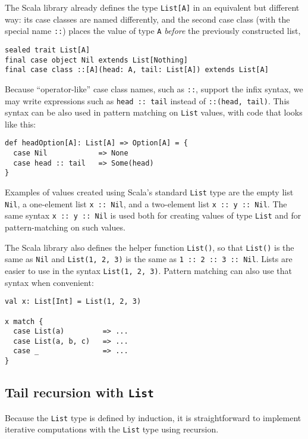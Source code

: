 The Scala library already defines the type \lstinline!List[A]! in
an equivalent but different way: its case classes are named differently,
and the second case class (with the special name \lstinline!::!)
places the value of type \lstinline!A! \emph{before} the previously
constructed list,
\begin{lstlisting}
sealed trait List[A]
final case object Nil extends List[Nothing]
final case class ::[A](head: A, tail: List[A]) extends List[A]
\end{lstlisting}
Because ``operator-like'' case class names, such as \lstinline!::!,
support the infix syntax, we may write expressions such as \lstinline!head :: tail!
instead of \lstinline!::(head, tail)!. This syntax can be also used
in pattern matching on \lstinline!List! values, with code that looks
like this:
\begin{lstlisting}
def headOption[A]: List[A] => Option[A] = {
  case Nil            => None
  case head :: tail   => Some(head)
}
\end{lstlisting}
Examples of values created using Scala's standard \lstinline!List!
type are the empty list \lstinline!Nil!, a one-element list \lstinline!x :: Nil!,
and a two-element list \lstinline!x :: y :: Nil!. The same syntax
\lstinline!x :: y :: Nil! is used both for creating values of type
\lstinline!List! and for pattern-matching on such values. 

The Scala library also defines the helper function \lstinline!List()!,
so that \lstinline!List()! is the same as \lstinline!Nil! and \lstinline!List(1, 2, 3)!
is the same as \lstinline!1 :: 2 :: 3 :: Nil!. Lists are easier to
use in the syntax \lstinline!List(1, 2, 3)!. Pattern matching can
also use that syntax when convenient:
\begin{lstlisting}
val x: List[Int] = List(1, 2, 3)

x match {
  case List(a)         => ...
  case List(a, b, c)   => ...
  case _               => ...
}
\end{lstlisting}


\subsection{Tail recursion with \texttt{List}\label{subsec:Tail-recursion-with-list}}

Because the \lstinline!List! type is defined by induction, it is
straightforward to implement iterative computations with the \lstinline!List!
type using recursion.

